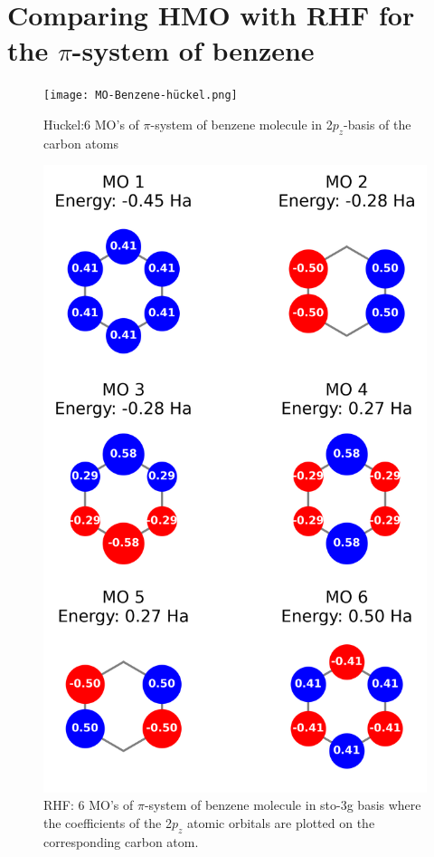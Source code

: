\documentclass[twoside,twocolumn,9pt]{article}
\begin{document}
\section{Comparing HMO with RHF for the $\pi$-system of benzene} \label{sec:HMO vs RHF for benzene}
\begin{center}
  \begin{figure}[H]
      \texttt{[image: MO-Benzene-hückel.png]}
      \caption{H$\ddot{\text{u}}$ckel:6 MO's of $\pi$-system of benzene molecule in 2$p_z$-basis of the carbon atoms}
      \label{fig:MO-Benzene-hückel}
  \end{figure}
\end{center}
\begin{center}
  \begin{figure}[H]
      \includegraphics[width=\linewidth]{MO-Benzene-6-rhf-sto-3g.png}
      \caption{RHF: 6 MO's of $\pi$-system of benzene molecule in sto-3g basis where the coefficients of the 2$p_z$ atomic orbitals are plotted on the corresponding carbon atom.}
      \label{fig:MO-Benzene-RHF-6-sto-3g}
  \end{figure}
\end{center}
\end{document}
